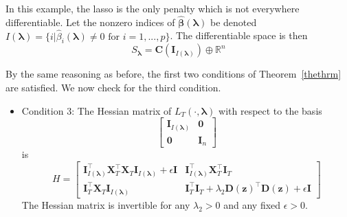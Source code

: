 \documentclass[12pt,letterpaper]{article}
\begin{document}
In this example, the lasso is the only penalty which is not everywhere differentiable. Let the nonzero indices of $\hat{\boldsymbol{\beta}}(\boldsymbol\lambda)$ be denoted $I(\boldsymbol\lambda) = \{i | \hat{\beta}_i(\boldsymbol\lambda) \ne 0 \text{ for } i=1,...,p \}$. The differentiable space is then
\begin{equation}
S_{\boldsymbol{\lambda}} = \boldsymbol C(\boldsymbol I_{I(\boldsymbol\lambda)}) \oplus \mathbb{R}^n
\end{equation}

By the same reasoning as before, the first two conditions of Theorem~\ref{thethrm} are satisfied. We now check for the third condition.
\begin{itemize}
\item[] Condition 3: The Hessian matrix of $L_T(\cdot, \boldsymbol{\lambda})$ with respect to the basis 
\begin{equation}
\begin{bmatrix}
\boldsymbol I_{I(\boldsymbol\lambda)} & \boldsymbol 0\\
\boldsymbol 0 & \boldsymbol I_n
\end{bmatrix}
\label{eq:aplmbasis}
\end{equation}
is
\begin{equation}
H =
\begin{bmatrix}
\boldsymbol I_{I(\boldsymbol \lambda)}^\top \boldsymbol X_T^\top \boldsymbol X_T \boldsymbol I_{I(\boldsymbol \lambda)} + \epsilon \boldsymbol I
&  \boldsymbol I_{I(\boldsymbol \lambda)}^\top \boldsymbol X_T^\top \boldsymbol I_T \\
\boldsymbol I_T^\top \boldsymbol X_T \boldsymbol I_{I(\boldsymbol \lambda)} &
\boldsymbol I_T^\top \boldsymbol{I}_T + \lambda_2 \boldsymbol{D}(\boldsymbol{z})^\top \boldsymbol{D}(\boldsymbol{z}) + \epsilon \boldsymbol I
\end{bmatrix}
\end{equation}
The Hessian matrix is invertible for any $\lambda_2 > 0$ and any fixed $\epsilon > 0$.
\end{itemize}
\end{document}
